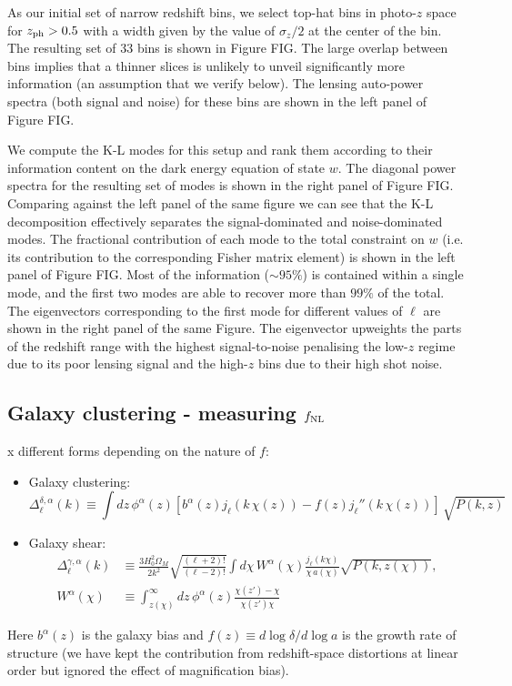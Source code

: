 \documentclass[a4paper,10pt]{article}
\begin{document}
    As our initial set of narrow redshift bins, we select top-hat bins in photo-$z$ space for $z_{\rm ph}>0.5$ with a width given by the value of $\sigma_z/2$ at the center of the bin. The resulting set of 33 bins is shown in Figure FIG. The large overlap between bins implies that a thinner slices is unlikely to unveil significantly more information (an assumption that we verify below). The lensing auto-power spectra (both signal and noise) for these bins are shown in the left panel of Figure FIG.
    
    We compute the K-L modes for this setup and rank them according to their information content on the dark energy equation of state $w$. The diagonal power spectra for the resulting set of modes is shown in the right panel of  Figure FIG.  Comparing against the left panel of the same figure we can see that the K-L decomposition effectively separates the signal-dominated and noise-dominated modes. The fractional contribution of each mode to the total constraint on $w$ (i.e. its contribution to the corresponding Fisher matrix element) is shown in the left panel of Figure FIG. Most of the information ($\sim95\%$) is contained within a single mode, and the first two modes are able to recover more than $99\%$ of the total. The eigenvectors corresponding to the first mode for different values of $\ell$ are shown in the right panel of the same Figure. The eigenvector upweights the parts of the redshift range with the highest signal-to-noise penalising the low-$z$ regime due to its poor lensing signal and the high-$z$ bins due to their high shot noise.


  \subsection{Galaxy clustering - measuring $f_{\rm NL}$}x
   different forms depending on the nature of $f$:
  \begin{itemize}
    \item Galaxy clustering:
          \begin{equation}
            \Delta^{\delta,\alpha}_\ell(k)\equiv\int dz\,\phi^\alpha(z)\left[b^\alpha(z)j_\ell(k\,\chi(z))-f(z)j_\ell''(k\,\chi(z))\right]\,\sqrt{P(k,z)}
          \end{equation}
    \item Galaxy shear:
          \begin{align}
            \Delta^{\gamma,\alpha}_\ell(k)&\equiv\frac{3H_0^2\Omega_M}{2k^2}\sqrt{\frac{(\ell+2)!}{(\ell-2)!}}\int d\chi\,W^\alpha(\chi)\frac{j_\ell(k\chi)}{\chi\,a(\chi)}\sqrt{P(k,z(\chi))},\\
            W^\alpha(\chi)&\equiv\int_{z(\chi)}^\infty dz\,\phi^\alpha(z)\frac{\chi(z')-\chi}{\chi(z')\chi}
          \end{align}
  \end{itemize}
  Here $b^\alpha(z)$ is the galaxy bias and $f(z)\equiv d\log\delta/d\log a$ is the growth rate of structure (we have kept the contribution from redshift-space distortions at linear order but ignored the effect of magnification bias).
  
\end{document}
